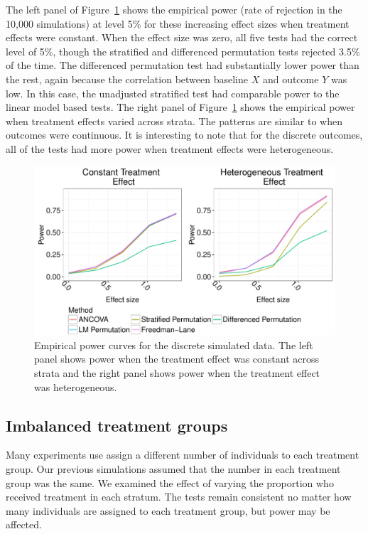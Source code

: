 \documentclass[12pt]{article}
\begin{document}
The left panel of Figure~\ref{fig:discrete_outcomes_sim_power} shows the empirical power (rate of rejection in the 10,000 simulations) at level 5\% for these increasing effect sizes when treatment effects were constant.
When the effect size was zero, all five tests had the correct level of 5\%, though the stratified and differenced permutation tests rejected 3.5\% of the time.
The differenced permutation test had substantially lower power than the rest,
again because the correlation between baseline $X$ and outcome $Y$ was low.
In this case, the unadjusted stratified test had comparable power to the linear model based tests.
The right panel of Figure~\ref{fig:discrete_outcomes_sim_power} shows the empirical power when treatment effects varied across strata.
The patterns are similar to when outcomes were continuous.
It is interesting to note that for the discrete outcomes, all of the tests had more power when treatment effects were heterogeneous.
\begin{figure}[h]
\centering
\includegraphics[width = \textwidth]{fig/discrete_outcomes_simulation_power.pdf}
\caption{Empirical power curves for the discrete simulated data. The left panel shows power when the treatment effect was constant across strata and the right panel shows power when the treatment effect was heterogeneous.}
\label{fig:discrete_outcomes_sim_power}
\end{figure}

\subsection{Imbalanced treatment groups}
Many experiments use assign a different number of individuals to each treatment group.
Our previous simulations assumed that the number in each treatment group was the same.
We examined the effect of varying the proportion who received treatment in each stratum.
The tests remain consistent no matter how many individuals are assigned to each treatment group, 
but power may be affected.
\end{document}
